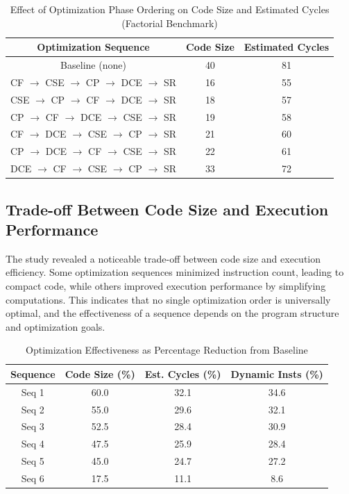 \documentclass[conference]{IEEEtran}
\begin{document}
\begin{table}[!htbp]
\centering
\caption{Effect of Optimization Phase Ordering on Code Size and Estimated Cycles (Factorial Benchmark)}
\label{tab:phase_order_tradeoff}
\begin{tabular}{|c|c|c|}
\hline
\textbf{Optimization Sequence} & \textbf{Code Size} & \textbf{Estimated Cycles} \\
\hline
Baseline (none) & 40 & 81 \\
CF $\rightarrow$ CSE $\rightarrow$ CP $\rightarrow$ DCE $\rightarrow$ SR & 16 & 55 \\
CSE $\rightarrow$ CP $\rightarrow$ CF $\rightarrow$ DCE $\rightarrow$ SR & 18 & 57 \\
CP $\rightarrow$ CF $\rightarrow$ DCE $\rightarrow$ CSE $\rightarrow$ SR & 19 & 58 \\
CF $\rightarrow$ DCE $\rightarrow$ CSE $\rightarrow$ CP $\rightarrow$ SR & 21 & 60 \\
CP $\rightarrow$ DCE $\rightarrow$ CF $\rightarrow$ CSE $\rightarrow$ SR & 22 & 61 \\
DCE $\rightarrow$ CF $\rightarrow$ CSE $\rightarrow$ CP $\rightarrow$ SR & 33 & 72 \\
\hline
\end{tabular}
\end{table}

\subsection{Trade-off Between Code Size and Execution Performance}
The study revealed a noticeable trade-off between code size and execution efficiency. Some optimization sequences minimized instruction count, leading to compact code, while others improved execution performance by simplifying computations. This indicates that no single optimization order is universally optimal, and the effectiveness of a sequence depends on the program structure and optimization goals.

\begin{table}[!htbp]
\centering
\caption{Optimization Effectiveness as Percentage Reduction from Baseline}
\label{tab:optimization_reduction}
\begin{tabular}{|c|c|c|c|}
\hline
\textbf{Sequence} & \textbf{Code Size (\%)} & \textbf{Est. Cycles (\%)} & \textbf{Dynamic Insts (\%)} \\
\hline
Seq 1 & 60.0 & 32.1 & 34.6 \\
Seq 2 & 55.0 & 29.6 & 32.1 \\
Seq 3 & 52.5 & 28.4 & 30.9 \\
Seq 4 & 47.5 & 25.9 & 28.4 \\
Seq 5 & 45.0 & 24.7 & 27.2 \\
Seq 6 & 17.5 & 11.1 & 8.6 \\
\hline
\end{tabular}
\end{table}
\end{document}
